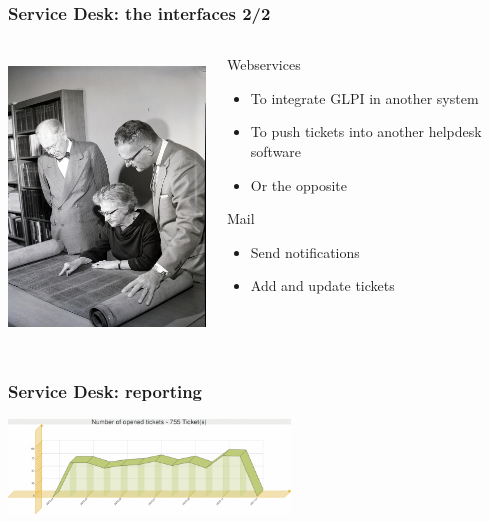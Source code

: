 \documentclass{beamer}
\begin{document}
\begin{frame}

    \frametitle{Service Desk: the interfaces 2/2}


 \begin{columns}
 \begin{column}{0.45\textwidth}
         \includegraphics[height=7.5cm]{./pics/servicedesk3.jpg}
 \end{column}
 \begin{column}{0.45\textwidth}
     \begin{block}{Webservices}
        \begin{itemize}
            \item To integrate GLPI in another system
            \item To push tickets into another helpdesk software
            \item Or the opposite
        \end{itemize}
    \end{block}
\pause
    \begin{block}{Mail}
       \begin{itemize}
            \item Send notifications
            \item Add and update tickets
       \end{itemize}
    \end{block}

 
 \end{column}
\end{columns}

\end{frame}

\begin{frame}

\frametitle{Service Desk: reporting}
\includegraphics[height=2.5cm]{./pics/report1.png}
\end{frame}
\end{document}
